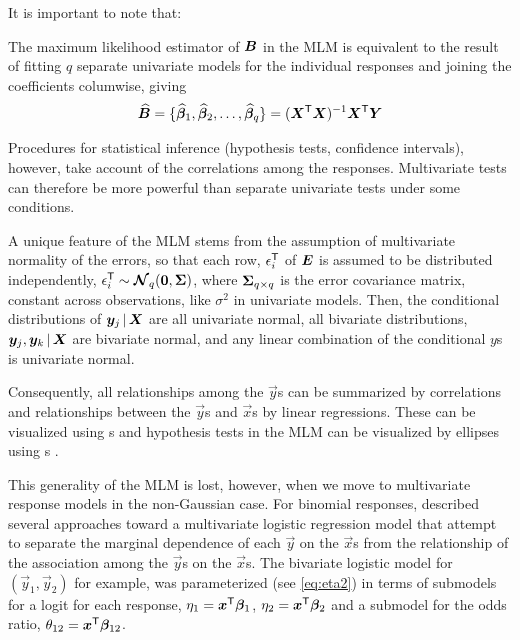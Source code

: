 \documentclass[11pt]{book}\usepackage[]{graphicx}\usepackage[]{color}
\begin{document}
It is important to note that:
\begin{itemize*}
  \item The maximum likelihood estimator of $\bm{B}$ in the MLM is equivalent to the result of fitting $q$ separate
  univariate models for the individual responses and joining the coefficients columwise, giving
\begin{equation*}
\widehat{\bm{B}} = \{ \widehat{\bm{\beta}}_1, \widehat{\bm{\beta}}_2, \dots , \widehat{\bm{\beta}}_q \}
                  = (\bm{X}^\mathsf{T} \bm{X})^{-1} \bm{X}^\mathsf{T} \bm{Y}
\end{equation*}
  \item Procedures for statistical inference (hypothesis tests, confidence intervals), however, take account of the correlations among the responses.  Multivariate tests can therefore be more powerful than separate univariate tests under
  some conditions.
  \item A unique feature of the MLM stems from the assumption of multivariate normality of the errors,
  so that
  each row, $\epsilon_i ^\mathsf{T}$ of $\bm{E}$ is assumed to be distributed independently,
  $ \epsilon_i ^\mathsf{T} \sim \bm{\mathcal{N}}_q (\bm{0}, \bm{\Sigma})$, where $\bm{\Sigma}_{q \times q}$
  is the error covariance matrix, constant across observations, like $\sigma^2$ in univariate models.
  Then, the conditional distributions of $\bm{y}_j \, | \, \bm{X}$ are all
  univariate normal, all bivariate distributions, $\bm{y}_j, \bm{y}_k \, | \, \bm{X}$ are bivariate normal,
  and any linear combination of the conditional $y$s is univariate normal.

  \item Consequently, all relationships among the $\vec{y}$s can be summarized by correlations and relationships between
  the $\vec{y}$s and $\vec{x}$s by linear regressions.  These can be visualized using
  s \citep{Friendly-etal:ellipses:2013} and hypothesis tests in the MLM can be visualized
  by ellipses
  using s
  \citep{Friendly:07:manova,FoxFriendlyMonette:09:compstat}.
\end{itemize*}

This generality of the MLM is lost, however, when we move to multivariate response models in the non-Gaussian case.
For binomial responses,  described several approaches toward a multivariate logistic
regression model that attempt to separate the marginal dependence of each $\vec{y}$ on the $\vec{x}$s
from the relationship of the association among the $\vec{y}$s on the $\vec{x}$s.
The bivariate logistic model for $(\vec{y}_1, \vec{y}_2)$
for example, was parameterized (see \eqref{eq:eta2}) in terms of submodels for a logit for each response,
$\eta_1 = \bm{x}^\mathsf{T} \bm{\beta}_1$,
$\eta_2 = \bm{x}^\mathsf{T} \bm{\beta}_2$
and a submodel for the odds ratio,
$\theta_{12} = \bm{x}^\mathsf{T} \bm{\beta}_{12}$.
\end{document}
